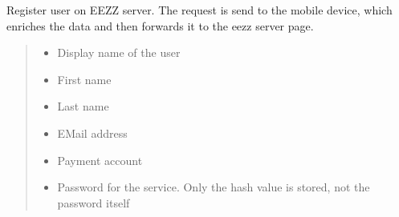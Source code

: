 \documentclass[letterpaper,10pt,english]{sphinxmanual}
\begin{document}
\begin{savenotes}
\begin{fulllineitems}

\begin{savenotes}\begin{fulllineitems}
\label{\detokenize{eezz:eezz.session.TSession.register_user}}
\pysigstartsignatures
{}
\pysigstopsignatures
\sphinxAtStartPar
Register user on EEZZ server. The request is send to the mobile device, which enriches the data and then
forwards it to the eezz server page.
\begin{quote}\begin{description}
\begin{itemize}
\item {} 
\sphinxAtStartPar
{} \textendash{} Display name of the user

\item {} 
\sphinxAtStartPar
{} \textendash{} First name

\item {} 
\sphinxAtStartPar
{} \textendash{} Last name

\item {} 
\sphinxAtStartPar
{} \textendash{} E\sphinxhyphen{}Mail address

\item {} 
\sphinxAtStartPar
{} \textendash{} Payment account

\item {} 
\sphinxAtStartPar
{} \textendash{} Password for the service. Only the hash value is stored, not the password itself


\end{itemize}
\end{description}
\end{quote}
\end{fulllineitems}
\end{savenotes}
\end{fulllineitems}
\end{savenotes}
\end{document}
